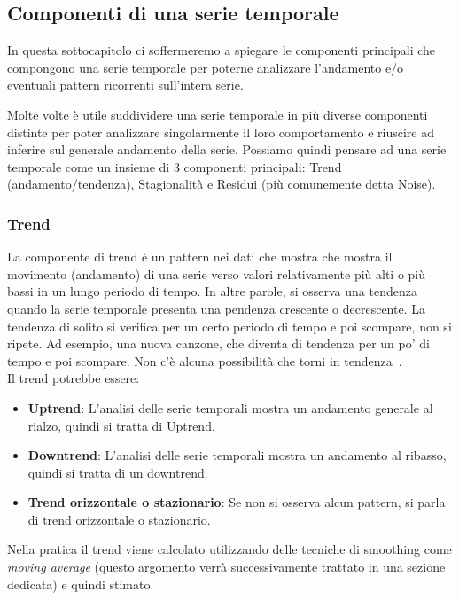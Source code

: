 \subsection{Componenti di una serie temporale}
In questa sottocapitolo ci soffermeremo a spiegare le componenti principali
che compongono una serie temporale per poterne analizzare l'andamento e/o
eventuali pattern ricorrenti sull'intera serie.


Molte volte è utile suddividere una serie temporale in più diverse componenti
distinte per poter analizzare singolarmente il loro comportamento e
riuscire ad inferire sul generale andamento della serie. Possiamo quindi
pensare ad una serie temporale come un insieme di 3 componenti principali:
Trend (andamento/tendenza), Stagionalità e Residui (più comunemente detta Noise).

\subsubsection{Trend}
La componente di trend è un pattern nei dati che mostra che mostra il 
movimento (andamento) di una serie verso valori relativamente più alti o più bassi 
in un lungo periodo di tempo. In altre parole, si osserva una tendenza quando 
la serie temporale presenta una pendenza crescente o decrescente. 
La tendenza di solito si verifica per un certo periodo di tempo 
e poi scompare, non si ripete. Ad esempio, una nuova canzone, 
che diventa di tendenza per un po' di tempo e poi scompare. 
Non c'è alcuna possibilità che torni in tendenza~\cite{gg:trend}.\\
Il trend potrebbe essere:
\begin{itemize}
    \setlength\itemsep{-0.6em}
    \item \textbf{Uptrend}: L'analisi delle serie temporali mostra un andamento generale al rialzo, quindi si tratta di Uptrend.
    \item \textbf{Downtrend}: L'analisi delle serie temporali mostra un andamento al ribasso, quindi si tratta di un downtrend.
    \item \textbf{Trend orizzontale o stazionario}: Se non si osserva alcun pattern, si parla di trend orizzontale o stazionario.
\end{itemize}

Nella pratica il trend viene calcolato utilizzando delle tecniche di smoothing come
\textit{moving average} (questo argomento verrà successivamente trattato in una sezione dedicata)
e quindi stimato.

